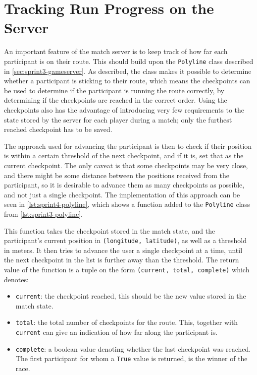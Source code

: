 \section{Tracking Run Progress on the Server}
An important feature of the match server is to keep track of how far each participant is on their route. This should build upon the \texttt{Polyline} class described in \autoref{sec:sprint3-gameserver}. As described, the class makes it possible to determine whether a participant is sticking to their route, which means the checkpoints can be used to determine if the participant is running the route correctly, by determining if the checkpoints are reached in the correct order. Using the checkpoints also has the advantage of introducing very few requirements to the state stored by the server for each player during a match; only the furthest reached checkpoint has to be saved.

The approach used for advancing the participant is then to check if their position is within a certain threshold of the next checkpoint, and if it is, set that as the current checkpoint. The only caveat is that some checkpoints may be very close, and there might be some distance between the positions received from the participant, so it is desirable to advance them as many checkpoints as possible, and not just a single checkpoint. The implementation of this approach can be seen in \autoref{lst:sprint4-polyline}, which shows a function added to the \texttt{Polyline} class from \autoref{lst:sprint3-polyline}.

This function takes the checkpoint stored in the match state, and the participant's current position in \texttt{(longitude, latitude)}, as well as a threshold in meters. It then tries to advance the user a single checkpoint at a time, until the next checkpoint in the list is further away than the threshold. The return value of the function is a tuple on the form \texttt{(current, total, complete)} which denotes:

\begin{itemize}
	\item{\texttt{current}: the checkpoint reached, this should be the new value stored in the match state.}
	\item{\texttt{total}: the total number of checkpoints for the route. This, together with \texttt{current} can give an indication of how far along the participant is.}
	\item{\texttt{complete}: a boolean value denoting whether the last checkpoint was reached. The first participant for whom a \texttt{True} value is returned, is the winner of the race.}
\end{itemize}

